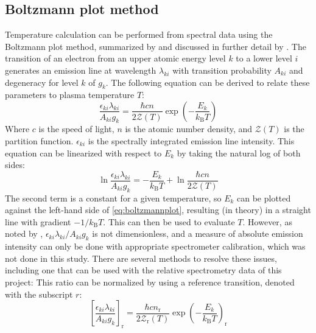         \subsection{Boltzmann plot method}
            Temperature calculation can be performed from spectral data using the Boltzmann plot method, summarized by \textcite{ohnoValidityElectronTemperature2006} and discussed in further detail by \textcite{griemSpectroscopicTemperatureMeasurements1997}. The transition of an electron from an upper atomic energy level $k$ to a lower level $i$  generates an emission line at wavelength $\lambda_{ki}$ with transition probability $A_{ki}$ and degeneracy for level $k$ of $g_k$. The following equation can be derived to relate these parameters to plasma temperature $T$:
            \begin{equation} \label{eq:transition_energy}
                \frac{\epsilon_{ki}\lambda_{ki}}{A_{ki}g_k} = \frac{\hbar cn}{2 \mathcal{Z}(T)}\exp{\left(-\frac{E_k}{k_\mathrm{B}T}\right)}
            \end{equation}
            Where $c$ is the speed of light, $n$ is the atomic number density, and $\mathcal{Z}(T)$ is the partition function. $\epsilon_{ki}$ is the spectrally integrated emission line intensity. This equation can be linearized with respect to $E_k$ by taking the natural log of both sides:
            \begin{equation} \label{eq:boltzmannplot}
                \ln{\frac{\epsilon_{ki}\lambda_{ki}}{A_{ki}g_k}} = -\frac{E_k}{k_\mathrm{B}T} + \ln{\frac{\hbar cn}{2 \mathcal{Z}(T)}}
            \end{equation}
            The second term is a constant for a given temperature, so $E_k$ can be plotted against the left-hand side of \autoref{eq:boltzmannplot}, resulting (in theory) in a straight line with gradient $-1/k_\mathrm{B}T$. This can then be used to evaluate $T$. However, as noted by \textcite{volkerImportancePhysicalUnits2022}, $\epsilon_{ki}\lambda_{ki}/A_{ki}g_k$ is not dimensionless, and a measure of absolute emission intensity can only be done with appropriate spectrometer calibration, which was not done in this study. There are several methods to resolve these issues, including one that can be used with the relative spectrometry data of this project: This ratio can be normalized by using a reference transition, denoted with the subscript $r$:
            \begin{equation} \label{eq:reference_transition}
                \left[\frac{\epsilon_{ki}\lambda_{ki}}{A_{ki}g_k}\right]_\mathrm{r} = \frac{\hbar cn_\mathrm{r}}{2 \mathcal{Z}_\mathrm{r}(T)}\exp{\left(-\frac{E_k}{k_\mathrm{B}T}\right)_\mathrm{r}}
            \end{equation}
